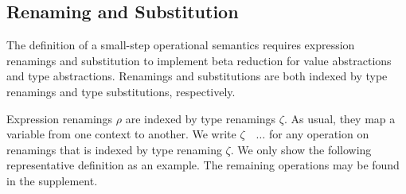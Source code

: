 \documentclass[manuscript,screen,review,anonymous,acmsmall]{acmart}
\begin{document}
\subsection{Renaming and Substitution}
\label{sec:expr-renam-subst}


The definition of a small-step operational semantics requires
expression renamings and substitution to implement beta reduction for
value abstractions and type abstractions.
Renamings and substitutions are both indexed by type renamings and
type substitutions, respectively.

Expression renamings $\rho$ are indexed by type renamings $\zeta$. As usual, they map a
variable from one context to another. We write $\zeta$~\AgdaFunction{$\mid$}~$\dots$ for any operation on
renamings that is indexed by type renaming $\zeta$. We only show the following
representative definition as an example. The remaining operations may be found in the
supplement. 
\SFExprRenaming




% 
% 
\end{document}
